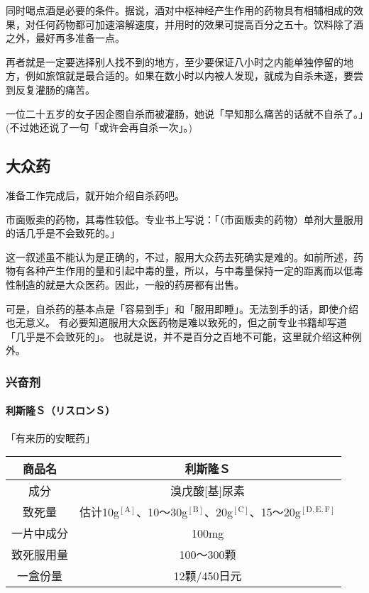 \documentclass[UTF8]{ctexart}
\begin{document}
同时喝点酒是必要的条件。据说，酒对中枢神经产生作用的药物具有相辅相成的效果，对任何药物都可加速溶解速度，并用时的效果可提高百分之五十。饮料除了酒之外，最好再多准备一点。

再者就是一定要选择别人找不到的地方，至少要保证八小时之内能单独停留的地方，例如旅馆就是最合适的。如果在数小时以内被人发现，就成为自杀未遂，要尝到反复灌肠的痛苦。

一位二十五岁的女子因企图自杀而被灌肠，她说「早知那么痛苦的话就不自杀了。」(不过她还说了一句「或许会再自杀一次」。)

\subsection{大众药}

准备工作完成后，就开始介绍自杀药吧。

市面贩卖的药物，其毒性较低。专业书上写说：「（市面贩卖的药物）单剂大量服用的话几乎是不会致死的。」

这一叙述虽不能认为是正确的，不过，服用大众药去死确实是难的。如前所述，药物有各种产生作用的量和引起中毒的量，所以，与中毒量保持一定的距离而以低毒性制造的就是大众医药。因此，一般的药房都有出售。

可是，自杀药的基本点是「容易到手」和「服用即睡」。无法到手的话，即使介绍也无意义。 有必要知道服用大众医药物是难以致死的，但之前专业书籍却写道「几乎是不会致死的」。 也就是说，并不是百分之百地不可能，这里就介绍这种例外。

\subsubsection*{兴奋剂}

\paragraph*{利斯隆Ｓ（リスロンＳ）}

\begin{flushright}
「有来历的安眠药」
\end{flushright}

\begin{table}[htbp]
\begin{center}
\begin{tabular}{cc}

\toprule
商品名 & 利斯隆Ｓ \\
\midrule
成分 & 溴戊酸[基]尿素 \\
致死量 & 估计10g$^\mathrm{[A]}$、10～30g$^\mathrm{[B]}$、20g$^\mathrm{[C]}$、15～20g$^{\mathrm{[D,E,F]}}$ \\
一片中成分 & 100mg \\
致死服用量 & 100～300颗 \\
一盒份量 & 12颗/450日元 \\
\bottomrule
\end{tabular}
\end{center}
\end{table}
\end{document}
